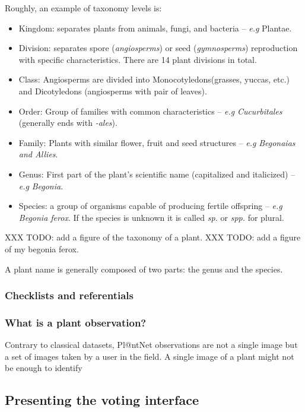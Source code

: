 Roughly, an example of taxonomy levels is:
\begin{itemize}
        \item Kingdom: separates plants from animals, fungi, and bacteria -- \emph{e.g} Plantae.
        \item Division: separates spore (\emph{angiosperms}) or seed (\emph{gymnosperms}) reproduction with specific characteristics. There are 14 plant divisions in total.
        \item Class: Angiosperms are divided into Monocotyledons(grasses, yuccas, etc.) and Dicotyledons (angiosperms with pair of leaves).
        \item Order: Group of families with common characteristics -- \emph{e.g} \emph{Cucurbitales} (generally ends with \emph{-ales}).
        \item Family: Plants with similar flower, fruit and seed structures -- \emph{e.g} \emph{Begonaias and Allies}.
        \item Genus: First part of the plant's scientific name (capitalized and italicized) -- \emph{e.g} \emph{Begonia}.
        \item Species: a group of organisms capable of producing fertile offspring -- \emph{e.g} \emph{Begonia ferox}. If the species is unknown it is called \emph{sp.} or \emph{spp.} for plural.
\end{itemize}

XXX TODO: add a figure of the taxonomy of a plant.
XXX TODO: add a figure of my begonia ferox.


A plant name is generally composed of two parts: the genus and the species.


\subsubsection{Checklists and referentials}




\subsubsection{What is a plant observation?}

Contrary to classical datasets, Pl@ntNet observations are not a single image but a set of images taken by a user in the field.
A single image of a plant might not be enough to identify

\subsection{Presenting the voting interface}

